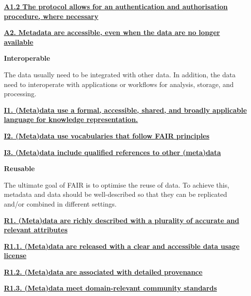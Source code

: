 \documentclass[
  a4paper,
  openany, a4paper, oneside]{book}
\begin{document}
\textbf{\href{https://www.go-fair.org/fair-principles/a1-2-protocol-allows-authentication-authorisation-required/}{A1.2 The protocol allows for an authentication and authorisation procedure, where necessary}}

\textbf{\href{https://www.go-fair.org/fair-principles/a2-metadata-accessible-even-data-no-longer-available/}{A2. Metadata are accessible, even when the data are no longer available}}

\textbf{{I}nteroperable}

The data usually need to be integrated with other data. In addition, the data need to interoperate with applications or workflows for analysis, storage, and processing.

\textbf{\href{https://www.go-fair.org/fair-principles/i1-metadata-use-formal-accessible-shared-broadly-applicable-language-knowledge-representation/}{I1. (Meta)data use a formal, accessible, shared, and broadly applicable language for knowledge representation.}}

\textbf{\href{https://www.go-fair.org/fair-principles/i2-metadata-use-vocabularies-follow-fair-principles/}{I2. (Meta)data use vocabularies that follow FAIR principles}}

\textbf{\href{https://www.go-fair.org/fair-principles/i3-metadata-include-qualified-references-metadata/}{I3. (Meta)data include qualified references to other (meta)data}}

\textbf{{R}eusable}

The ultimate goal of FAIR is to optimise the reuse of data. To achieve this, metadata and data should be well-described so that they can be replicated and/or combined in different settings.

\textbf{\href{https://www.go-fair.org/fair-principles/r1-metadata-richly-described-plurality-accurate-relevant-attributes/}{R1. (Meta)data are richly described with a plurality of accurate and relevant attributes}}

\textbf{\href{https://www.go-fair.org/fair-principles/r1-1-metadata-released-clear-accessible-data-usage-license/}{R1.1. (Meta)data are released with a clear and accessible data usage license}}

\textbf{\href{https://www.go-fair.org/fair-principles/r1-2-metadata-associated-detailed-provenance/}{R1.2. (Meta)data are associated with detailed provenance}}

\textbf{\href{https://www.go-fair.org/fair-principles/r1-3-metadata-meet-domain-relevant-community-standards/}{R1.3. (Meta)data meet domain-relevant community standards}}
\end{document}
